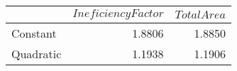 \begin{tabular}{lrr}
\toprule
{} &  $Ineficiency Factor$ &  $TotalArea$ \\
\midrule
Constant  &                1.8806 &       1.8850 \\
Quadratic &                1.1938 &       1.1906 \\
\bottomrule
\end{tabular}
